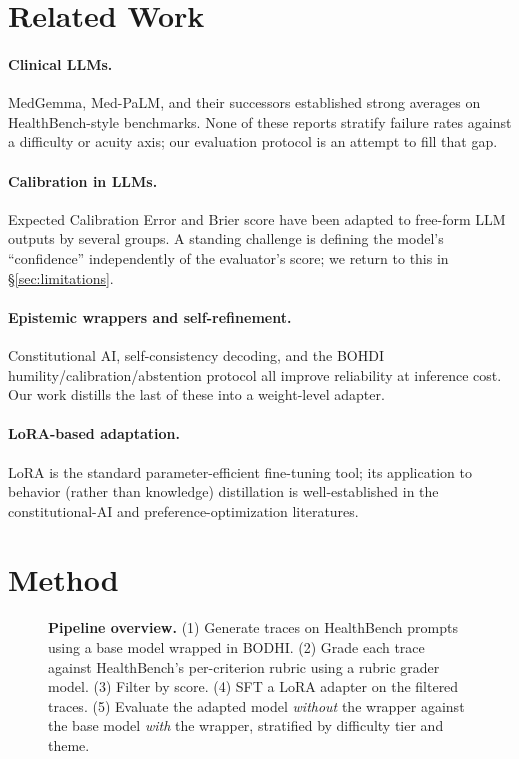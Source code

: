\documentclass[10pt,letterpaper]{article}
\begin{document}
\section{Related Work}
\label{sec:related}

\paragraph{Clinical LLMs.} MedGemma,
Med-PaLM, and their successors established
strong averages on HealthBench-style benchmarks. None of these reports
stratify failure rates against a difficulty or acuity axis; our
evaluation protocol is an attempt to fill that gap.

\paragraph{Calibration in LLMs.}
Expected Calibration Error and Brier
score have been adapted to free-form LLM
outputs by several groups. A standing
challenge is defining the model's ``confidence'' independently of the
evaluator's score; we return to this in \S\ref{sec:limitations}.

\paragraph{Epistemic wrappers and self-refinement.}
Constitutional AI, self-consistency
decoding, and the BOHDI
humility/calibration/abstention protocol all
improve reliability at inference cost. Our work distills the last of
these into a weight-level adapter.

\paragraph{LoRA-based adaptation.} LoRA is the
standard parameter-efficient fine-tuning tool; its application to
behavior (rather than knowledge) distillation is well-established
in the constitutional-AI and
preference-optimization literatures.

\section{Method}
\label{sec:method}

\begin{figure}[t]
  \centering
  \resizebox{\linewidth}{!}{}
  \caption{\textbf{Pipeline overview.} (1) Generate traces on
  HealthBench prompts using a base model wrapped in BODHI.
  (2) Grade each trace against HealthBench's per-criterion rubric using
  a rubric grader model. (3) Filter by score. (4) SFT a LoRA adapter on
  the filtered traces. (5) Evaluate the adapted model
  \emph{without} the wrapper against the base model
  \emph{with} the wrapper, stratified by difficulty tier and theme.}
  \label{fig:pipeline}
\end{figure}
\end{document}
